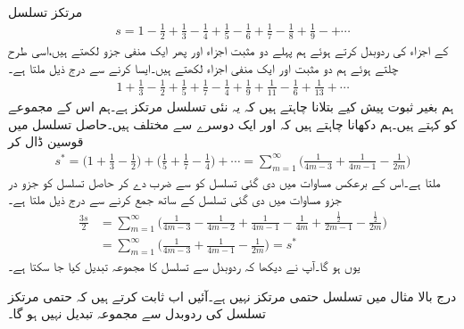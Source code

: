 \quad {}\\
مرتکز تسلسل
\begin{align*}
s=1-\frac{1}{2}+\frac{1}{3}-\frac{1}{4}+\frac{1}{5}-\frac{1}{6}+\frac{1}{7}-\frac{1}{8}+\frac{1}{9}-+\cdots
\end{align*}
کے اجزاء کی ردوبدل  کرتے ہوئے  ہم پہلے دو مثبت اجزاء اور پھر ایک منفی جزو لکھتے ہیں،اسی طرح چلتے ہوئے ہم دو مثبت اور ایک منفی اجزاء لکھتے ہیں۔ایسا کرنے سے درج ذیل ملتا ہے۔
\begin{align*}
1+\frac{1}{3}-\frac{1}{2}+\frac{1}{5}+\frac{1}{7}-\frac{1}{4}+\frac{1}{9}+\frac{1}{11}-\frac{1}{6}+\frac{1}{13}+\cdots
\end{align*} 
ہم بغیر ثبوت پیش کیے بتلانا چاہتے ہیں کہ یہ نئی تسلسل مرتکز ہے۔ہم اس کے مجموعے کو  کہتے ہیں۔ہم دکھانا چاہتے ہیں کہ  اور  ایک دوسرے سے مختلف ہیں۔حاصل تسلسل میں قوسین ڈال کر 
\begin{align*}
s^*=\big(1+\frac{1}{3}-\frac{1}{2}\big)+\big(\frac{1}{5}+\frac{1}{7}-\frac{1}{4}\big)+\cdots=\sum\limits_{m=1}^{\infty}\big(\frac{1}{4m-3}+\frac{1}{4m-1}-\frac{1}{2m}\big)
\end{align*}
ملتا ہے۔اس کے برعکس  مساوات  میں دی گئی تسلسل کو  سے ضرب دے کر حاصل تسلسل کو جزو در جزو   مساوات  میں دی گئی تسلسل کے ساتھ جمع کرنے سے درج ذیل ملتا ہے۔
\begin{align*}
\frac{3s}{2}&=\sum\limits_{m=1}^{\infty} \big(\frac{1}{4m-3}-\frac{1}{4m-2}+\frac{1}{4m-1}-\frac{1}{4m}+\frac{\tfrac{1}{2}}{2m-1}-\frac{\tfrac{1}{2}}{2m}\big)\\
&=\sum\limits_{m=1}^{\infty}\big(\frac{1}{4m-3}+\frac{1}{4m-1}-\frac{1}{2m}\big)=s^*
\end{align*}
یوں  ہو گا۔آپ نے دیکھا کہ ردوبدل سے تسلسل کا مجموعہ تبدیل کیا جا سکتا ہے۔

درج بالا مثال میں تسلسل حتمی مرتکز نہیں ہے۔آئیں اب ثابت کرتے ہیں کہ حتمی مرتکز تسلسل کی ردوبدل سے  مجموعہ تبدیل نہیں ہو گا۔

